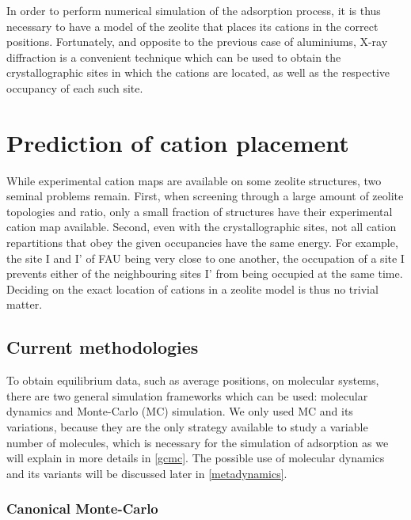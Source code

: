 \documentclass[main.tex]{subfiles}
\begin{document}
In order to perform numerical simulation of the adsorption process, it is thus necessary to have a model of the zeolite that places its cations in the correct positions. Fortunately, and opposite to the previous case of aluminiums, X-ray diffraction is a convenient technique which can be used to obtain the crystallographic sites in which the cations are located, as well as the respective occupancy of each such site.


\section{Prediction of cation placement}

While experimental cation maps are available on some zeolite structures, two seminal problems remain. First, when screening through a large amount of zeolite topologies and \SiAl ratio, only a small fraction of structures have their experimental cation map available. Second, even with the crystallographic sites, not all cation repartitions that obey the given occupancies have the same energy. For example, the site I and I' of FAU being very close to one another, the occupation of a site I prevents either of the neighbouring sites I' from being occupied at the same time. Deciding on the exact location of cations in a zeolite model is thus no trivial matter.

\subsection{Current methodologies}

To obtain equilibrium data, such as average positions, on molecular systems, there are two general simulation frameworks which can be used: molecular dynamics and Monte-Carlo (MC) simulation. We only used MC and its variations, because they are the only strategy available to study a variable number of molecules, which is necessary for the simulation of adsorption as we will explain in more details in \autoref{gcmc}. The possible use of molecular dynamics and its variants will be discussed later in \autoref{metadynamics}.

\subsubsection{Canonical Monte-Carlo}
\end{document}
